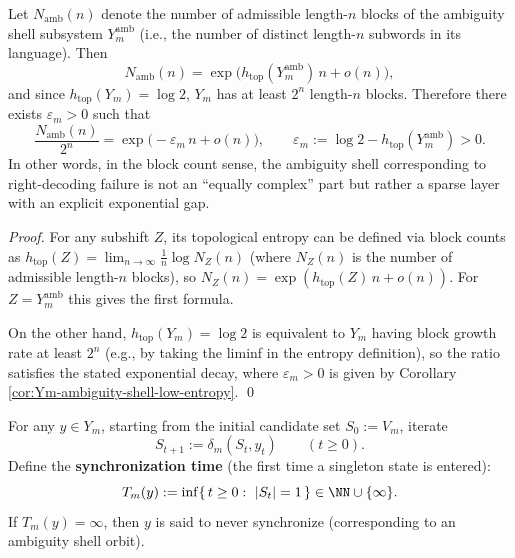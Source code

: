 \begin{corollary}\label{cor:Ym-ambiguity-shell-exponentially-thin}
Let \(N_{\mathrm{amb}}(n)\) denote the number of admissible length-\(n\) blocks of the ambiguity shell subsystem \(Y_m^{\mathrm{amb}}\) (i.e., the number of distinct length-\(n\) subwords in its language). Then
\[
N_{\mathrm{amb}}(n)=\exp\!\bigl(h_{\mathrm{top}}(Y_m^{\mathrm{amb}})\,n+o(n)\bigr),
\]
and since \(h_{\mathrm{top}}(Y_m)=\log 2\), \(Y_m\) has at least \(2^n\) length-\(n\) blocks. Therefore there exists \(\varepsilon_m>0\) such that
\[
\frac{N_{\mathrm{amb}}(n)}{2^n}
=
\exp\!\bigl(-\varepsilon_m\,n+o(n)\bigr),
\qquad
\varepsilon_m:=\log 2-h_{\mathrm{top}}(Y_m^{\mathrm{amb}})>0.
\]
In other words, in the block count sense, the ambiguity shell corresponding to right-decoding failure is not an ``equally complex'' part but rather a sparse layer with an explicit exponential gap.
\end{corollary}

\begin{proof}
For any subshift \(Z\), its topological entropy can be defined via block counts as
\(
h_{\mathrm{top}}(Z)=\lim_{n\to\infty}\frac{1}{n}\log N_Z(n)
\)
(where \(N_Z(n)\) is the number of admissible length-\(n\) blocks), so \(N_Z(n)=\exp(h_{\mathrm{top}}(Z)\,n+o(n))\). For \(Z=Y_m^{\mathrm{amb}}\) this gives the first formula.
\par
On the other hand, \(h_{\mathrm{top}}(Y_m)=\log 2\) is equivalent to \(Y_m\) having block growth rate at least \(2^n\) (e.g., by taking the liminf in the entropy definition), so the ratio satisfies the stated exponential decay, where \(\varepsilon_m>0\) is given by Corollary \ref{cor:Ym-ambiguity-shell-low-entropy}. \qed
\end{proof}

\begin{definition}\label{def:Ym-sync-time}
For any \(y\in Y_m\), starting from the initial candidate set \(S_0:=V_m\), iterate
\[
S_{t+1}:=\delta_m(S_t,y_t)\qquad (t\ge 0).
\]
Define the \textbf{synchronization time} (the first time a singleton state is entered):
\[
T_m(y):=\inf\{\,t\ge 0:\ |S_t|=1\,\}\in\NN\cup\{\infty\}.
\]
If \(T_m(y)=\infty\), then \(y\) is said to never synchronize (corresponding to an ambiguity shell orbit).
\end{definition}

